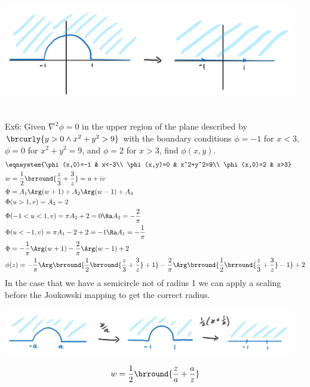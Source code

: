 \centerline{\includegraphics[width=0.95\textwidth]{Images/ComplexAnalysisPictures/JoukowskiMap.png}}\\
Ex6: Given $\nabla^2\phi=0$ in the upper region of the plane described by $\brcurly{y>0\wedge x^2+y^2>9}$ with the boundary conditions $\phi=-1$ for $x<3$, $\phi=0$ for $x^2+y^2=9$, and $\phi=2$ for $x>3$, find $\phi(x,y)$.
\begin{align*}
    &\eqnsystem{\phi(x,0)=-1 & x<-3\\ \phi(x,y)=0 & x^2+y^2=9\\ \phi(x,0)=2 & x>3}\\
    &w=\frac{1}{2}\brround{\frac{z}{3}+\frac{3}{z}}=u+iv\\
    &\Phi=A_1\Arg(w+1)+A_2\Arg(w-1)+A_3\\
    &\Phi(u>1,v)=A_3=2\\
    &\Phi(-1<u<1,v)=\pi A_2+2=0\Ra A_2=-\frac{2}{\pi}\\
    &\Phi(u<-1,v)=\pi A_1-2+2=-1\Ra A_1=-\frac{1}{\pi}\\
    &\Phi=-\frac{1}{\pi}\Arg(w+1)-\frac{2}{\pi}\Arg(w-1)+2\\
    &\phi(z)=-\frac{1}{\pi}\Arg\brround{\frac{1}{2}\brround{\frac{z}{3}+\frac{3}{z}}+1}-\frac{2}{\pi}\Arg\brround{\frac{1}{2}\brround{\frac{z}{3}+\frac{3}{z}}-1}+2
\end{align*}
In the case that we have a semicircle not of radius 1 we can apply a scaling before the Joukowski mapping to get the correct radius.\\
\centerline{\includegraphics[width=0.95\textwidth]{Images/ComplexAnalysisPictures/JoukowskiShift.png}}
\[w=\frac{1}{2}\brround{\frac{z}{a}+\frac{a}{z}}\]

